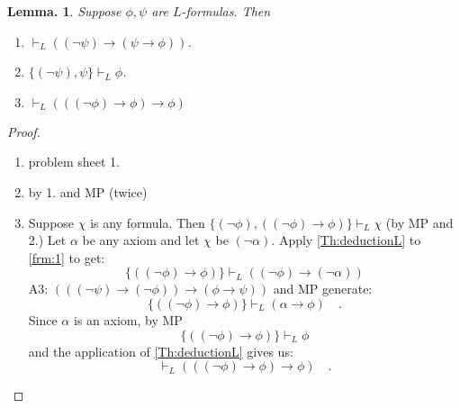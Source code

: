 \documentclass[a4paper,oneside,11pt,DIV=12,parskip=half]{scrartcl}
\theoremstyle{plain}
\newtheorem{lemma}[theorem]{Lemma.}
\theoremstyle{definition}
\newtheorem{remark, definition}[theorem]{Remark and Definition.}
\newtheorem{lemma, definition}[theorem]{Lemma and Definition.}
\newtheorem{theorem, definition}[theorem]{Theorem and Definition.}
\theoremstyle{remark}
\newtheorem*{remark, example}{\textbf{Remark and Exercise}}
\begin{document}
\begin{lemma}
Suppose $\phi,\psi$ are $L$-formulas. Then
\begin{enumerate}
    \item $\vdash_L ((\lnot \psi) \rightarrow (\psi \rightarrow \phi))$.
    \item $\{(\lnot \psi),\psi\} \vdash_L \phi$.
    \item $\vdash_L (((\lnot \phi) \rightarrow \phi) \rightarrow \phi)$
\end{enumerate}
\end{lemma}

\begin{proof}
\begin{enumerate}
    \item problem sheet 1.
    \item by 1. and MP (twice)
    \item Suppose $\chi$ is any formula. Then $\{(\lnot \phi),((\lnot \phi) \rightarrow \phi) \} \vdash_L \chi$\label{frm:1} (by MP and 2.) 
    Let $\alpha$ be any axiom and let $\chi$ be $(\lnot \alpha)$.
    Apply \ref{Th:deductionL} to \ref{frm:1} to get:
    \[ \{((\lnot \phi) \rightarrow \phi)\} \vdash_L ((\lnot \phi) \rightarrow (\lnot \alpha)) \]
    A3: $(((\lnot \psi) \rightarrow ( \lnot \phi)) \rightarrow (\phi \rightarrow \psi))$ and MP generate:
    \[ \{((\lnot \phi) \rightarrow \phi)\} \vdash_L ( \alpha \rightarrow \phi) \quad. \]
    Since $\alpha$ is an axiom, by MP
        \[ \{((\lnot \phi) \rightarrow \phi)\} \vdash_L \phi \] and the application of \ref{Th:deductionL} gives us:
        \[ \vdash_L (((\lnot \phi) \rightarrow \phi) \rightarrow \phi) \quad. \]
\end{enumerate}

\end{proof}
\end{document}
